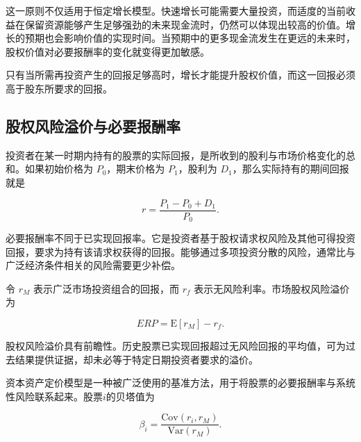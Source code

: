 这一原则不仅适用于恒定增长模型。快速增长可能需要大量投资，而适度的当前收益在保留资源能够产生足够强劲的未来现金流时，仍然可以体现出较高的价值。增长的预期也会影响价值的实现时间。当预期中的更多现金流发生在更远的未来时，股权价值对必要报酬率的变化就变得更加敏感。

\begin{tcolorbox}[
  enhanced,
  breakable,
  colback=white,
  colframe=FinanceBlue,
  boxrule=0.7pt,
  sharp corners,
  borderline west={2.2pt}{0pt}{FinanceBlue},
  title=\textbf{财务展望：增长并不等同于价值创造},
  coltitle=white,
  colbacktitle=FinanceBlue,
  fonttitle=\bfseries,
  before skip=1.2em,
  after skip=1.2em
]

只有当所需再投资产生的回报足够高时，增长才能提升股权价值，而这一回报必须高于股东所要求的回报。

\end{tcolorbox}

\subsection{股权风险溢价与必要报酬率}

投资者在某一时期内持有的股票的实际回报，是所收到的股利与市场价格变化的总和。如果初始价格为 \(P_0\)，期末价格为 \(P_1\)，股利为 \(D_1\)，那么实际持有的期间回报就是

\begin{equation}
r
=
\frac{P_1-P_0+D_1}{P_0}.
\label{eq:ch9-equity-realized-return}
\end{equation}

必要报酬率不同于已实现回报率。它是投资者基于股权请求权风险及其他可得投资回报，要求为持有该请求权获得的回报。能够通过多项投资分散的风险，通常比与广泛经济条件相关的风险需要更少补偿。

令 \(r_M\) 表示广泛市场投资组合的回报，而 \(r_f\) 表示无风险利率。市场股权风险溢价为

\begin{equation}
ERP
=
\mathrm{E}[r_M]-r_f.
\label{eq:ch9-equity-risk-premium}
\end{equation}

股权风险溢价具有前瞻性。历史股票已实现回报超过无风险回报的平均值，可为过去结果提供证据，却未必等于特定日期投资者要求的溢价。

资本资产定价模型是一种被广泛使用的基准方法，用于将股票的必要报酬率与系统性风险联系起来。股票\(i\)的贝塔值为

\begin{equation}
\beta_i
=
\frac{\mathrm{Cov}(r_i,r_M)}
{\mathrm{Var}(r_M)}.
\label{eq:ch9-beta}
\end{equation}

